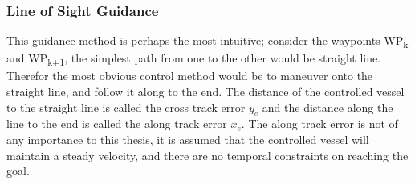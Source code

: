 \subsubsection*{Line of Sight Guidance} %

This guidance method is perhaps the most intuitive; consider the waypoints WP\textsubscript{k} and WP\textsubscript{k+1}, the simplest path
from one to the other would be straight line. Therefor the most obvious control method would be to maneuver onto the straight line, and
follow it along to the end. The distance of the controlled vessel to the straight line is called the cross track error $y_e$ and the distance along the line
to the end is called the along track error $x_e$. The along track error is not of any importance to this thesis, it is assumed that the controlled
vessel will maintain a steady velocity, and there are no temporal constraints on reaching the goal.

